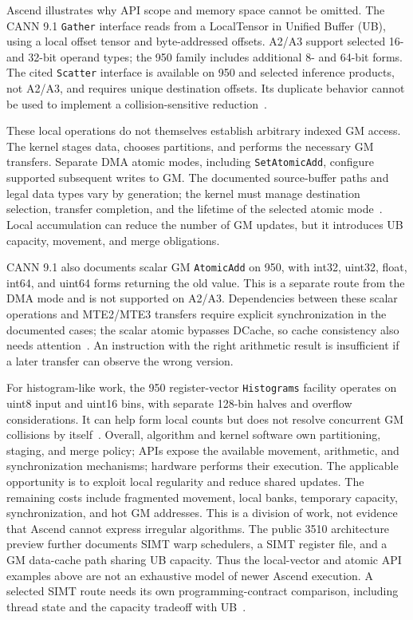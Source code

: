 Ascend illustrates why API scope and memory space cannot be omitted. The CANN 9.1 \texttt{Gather} interface reads from a LocalTensor in Unified Buffer (UB), using a local offset tensor and byte-addressed offsets. A2/A3 support selected 16- and 32-bit operand types; the 950 family includes additional 8- and 64-bit forms. The cited \texttt{Scatter} interface is available on 950 and selected inference products, not A2/A3, and requires unique destination offsets. Its duplicate behavior cannot be used to implement a collision-sensitive reduction~\citep{u004_ascend_gather,u004_ascend_scatter}.

These local operations do not themselves establish arbitrary indexed GM access. The kernel stages data, chooses partitions, and performs the necessary GM transfers. Separate DMA atomic modes, including \texttt{SetAtomicAdd}, configure supported subsequent writes to GM. The documented source-buffer paths and legal data types vary by generation; the kernel must manage destination selection, transfer completion, and the lifetime of the selected atomic mode~\citep{u004_ascend_dma_atomic}. Local accumulation can reduce the number of GM updates, but it introduces UB capacity, movement, and merge obligations.

CANN 9.1 also documents scalar GM \texttt{AtomicAdd} on 950, with int32, uint32, float, int64, and uint64 forms returning the old value. This is a separate route from the DMA mode and is not supported on A2/A3. Dependencies between these scalar operations and MTE2/MTE3 transfers require explicit synchronization in the documented cases; the scalar atomic bypasses DCache, so cache consistency also needs attention~\citep{u004_ascend_scalar_atomic}. An instruction with the right arithmetic result is insufficient if a later transfer can observe the wrong version.

For histogram-like work, the 950 register-vector \texttt{Histograms} facility operates on uint8 input and uint16 bins, with separate 128-bin halves and overflow considerations. It can help form local counts but does not resolve concurrent GM collisions by itself~\citep{u004_ascend_histograms}. Overall, algorithm and kernel software own partitioning, staging, and merge policy; APIs expose the available movement, arithmetic, and synchronization mechanisms; hardware performs their execution. The applicable opportunity is to exploit local regularity and reduce shared updates. The remaining costs include fragmented movement, local banks, temporary capacity, synchronization, and hot GM addresses. This is a division of work, not evidence that Ascend cannot express irregular algorithms. The public 3510 architecture preview further documents SIMT warp schedulers, a SIMT register file, and a GM data-cache path sharing UB capacity. Thus the local-vector and atomic API examples above are not an exhaustive model of newer Ascend execution. A selected SIMT route needs its own programming-contract comparison, including thread state and the capacity tradeoff with UB~\citep{u003_ascend_3510}.


